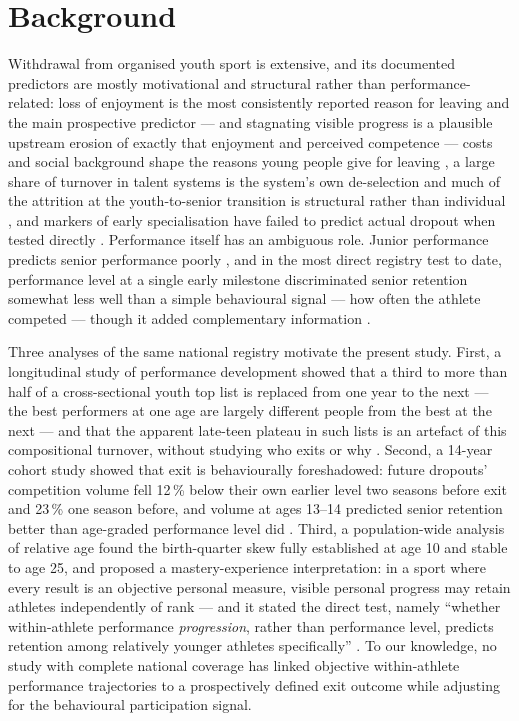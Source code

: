 \documentclass[12pt,a4paper]{article}
\begin{document}
\newpage

\section{Background}

Withdrawal from organised youth sport is extensive, and its documented predictors are mostly motivational and structural rather than performance-related: loss of enjoyment is the most consistently reported reason for leaving \cite{crane2015} and the main prospective predictor \cite{vanyperen2021} --- and stagnating visible progress is a plausible upstream erosion of exactly that enjoyment and perceived competence --- costs and social background shape the reasons young people give for leaving \cite{espedalen2022}, a large share of turnover in talent systems is the system's own de-selection \cite{gullichbarth2026} and much of the attrition at the youth-to-senior transition is structural rather than individual \cite{filo2026}, and markers of early specialisation have failed to predict actual dropout when tested directly \cite{larson2019}. Performance itself has an ambiguous role. Junior performance predicts senior performance poorly \cite{kearney2018,barth2022,gullich2025}, and in the most direct registry test to date, performance level at a single early milestone discriminated senior retention somewhat less well than a simple behavioural signal --- how often the athlete competed --- though it added complementary information \cite{guttormsen2026dropout}.

Three analyses of the same national registry motivate the present study. First, a longitudinal study of performance development showed that a third to more than half of a cross-sectional youth top list is replaced from one year to the next --- the best performers at one age are largely different people from the best at the next --- and that the apparent late-teen plateau in such lists is an artefact of this compositional turnover, without studying who exits or why \cite{guttormsen2026development}. Second, a 14-year cohort study showed that exit is behaviourally foreshadowed: future dropouts' competition volume fell 12\,\% below their own earlier level two seasons before exit and 23\,\% one season before, and volume at ages 13--14 predicted senior retention better than age-graded performance level did \cite{guttormsen2026dropout}. Third, a population-wide analysis of relative age found the birth-quarter skew fully established at age 10 and stable to age 25, and proposed a mastery-experience interpretation: in a sport where every result is an objective personal measure, visible personal progress may retain athletes independently of rank --- and it stated the direct test, namely ``whether within-athlete performance \emph{progression}, rather than performance level, predicts retention among relatively younger athletes specifically'' \cite{guttormsen2026rae}. To our knowledge, no study with complete national coverage has linked objective within-athlete performance trajectories to a prospectively defined exit outcome while adjusting for the behavioural participation signal.
\end{document}
